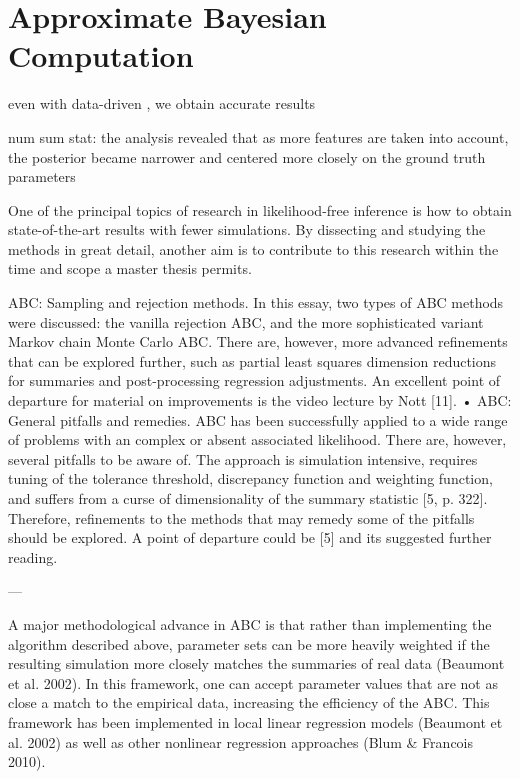 \section{Approximate Bayesian Computation}

even with data-driven , we obtain accurate results

num sum stat: the analysis revealed that as more features are taken into account, the posterior became narrower and centered more closely on the ground truth parameters

One of the principal topics of research in likelihood-free inference is how to obtain state-of-the-art results with fewer simulations. By dissecting and studying the methods in great detail, another aim is to contribute to this research within the time and scope a master thesis permits. 

ABC: Sampling and rejection methods. In this essay, two types of ABC methods were discussed: the vanilla rejection ABC, and the more sophisticated variant Markov chain Monte Carlo ABC. There are, however, more advanced refinements that can be explored further, such as partial least squares dimension reductions for summaries and post-processing regression adjustments. An excellent point of departure for material on improvements is the video lecture by Nott [11].
• ABC: General pitfalls and remedies. ABC has been successfully applied to a wide range of problems with an complex or absent associated likelihood. There are, however, several pitfalls to be aware of. The approach is simulation intensive, requires tuning of the tolerance threshold, discrepancy function and weighting function, and suffers from a curse of dimensionality of the summary statistic [5, p. 322]. Therefore, refinements to the methods that may remedy some of the pitfalls should be explored. A point of departure could be [5] and its suggested further reading. 

---

A major methodological advance in ABC is that rather than implementing the algorithm described above, parameter sets can be more heavily weighted if the resulting simulation more closely matches the summaries of real data (Beaumont et al. 2002). In this framework, one can accept parameter values that are not as close a match to the empirical data, increasing the efficiency of the ABC. This framework has been implemented in local linear regression models (Beaumont et al. 2002) as well as other nonlinear regression approaches (Blum \& Francois 2010). 

